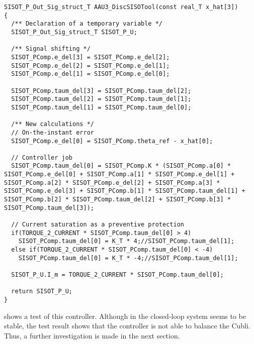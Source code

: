 \begin{lstlisting}[caption={Code for the implementation of the controller designed from root locus in C\texttt{++}}, label=lst:codeSISOTController]
SISOT_P_Out_Sig_struct_T AAU3_DiscSISOTool(const real_T x_hat[3])
{
  /** Declaration of a temporary variable */
  SISOT_P_Out_Sig_struct_T SISOT_P_U;
  
  /** Signal shifting */
  SISOT_PComp.e_del[3] = SISOT_PComp.e_del[2];
  SISOT_PComp.e_del[2] = SISOT_PComp.e_del[1];
  SISOT_PComp.e_del[1] = SISOT_PComp.e_del[0];

  SISOT_PComp.taum_del[3] = SISOT_PComp.taum_del[2];
  SISOT_PComp.taum_del[2] = SISOT_PComp.taum_del[1];
  SISOT_PComp.taum_del[1] = SISOT_PComp.taum_del[0];
  
  /** New calculations */
  // On-the-instant error
  SISOT_PComp.e_del[0] = SISOT_PComp.theta_ref - x_hat[0]; 

  // Controller job
  SISOT_PComp.taum_del[0] = SISOT_PComp.K * (SISOT_PComp.a[0] * SISOT_PComp.e_del[0] + SISOT_PComp.a[1] * SISOT_PComp.e_del[1] + SISOT_PComp.a[2] * SISOT_PComp.e_del[2] + SISOT_PComp.a[3] * SISOT_PComp.e_del[3] + SISOT_PComp.b[1] * SISOT_PComp.taum_del[1] + SISOT_PComp.b[2] * SISOT_PComp.taum_del[2] + SISOT_PComp.b[3] * SISOT_PComp.taum_del[3]);
  
  // Current saturation as a preventive protection
  if(TORQUE_2_CURRENT * SISOT_PComp.taum_del[0] > 4)
    SISOT_PComp.taum_del[0] = K_T * 4;//SISOT_PComp.taum_del[1];
  else if(TORQUE_2_CURRENT * SISOT_PComp.taum_del[0] < -4)
    SISOT_PComp.taum_del[0] = K_T * -4;//SISOT_PComp.taum_del[1];
  
  SISOT_P_U.I_m = TORQUE_2_CURRENT * SISOT_PComp.taum_del[0];
  
  return SISOT_P_U;
}
\end{lstlisting}

 shows a test of this controller. Although in  the closed-loop system seems to be stable, the test result shows that the controller is not able to balance the Cubli. Thus, a further investigation is made in the next section.